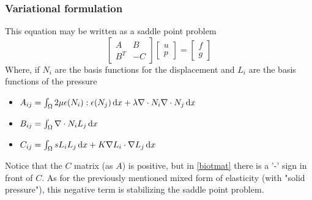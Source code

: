\begin{frame}
\frametitle{Variational formulation}
This equation may be written as a saddle point problem 
\begin{equation}
\label{biotmat}
\left[
\begin{array}{cc}
A & B \\
B^T & -C
\end{array}
\right]
\left[
\begin{array}{c} u \\ p \end{array} 
\right]
= 
\left[
\begin{array}{c} f \\ g \end{array} 
\right]
\end{equation}
Where, if $N_i$ are the basis functions for the displacement 
and $L_i$ are the basis functions of the pressure
\begin{itemize}
\item $A_{ij} =  \int_\Omega 2 \mu \epsilon(N_i) : \epsilon(N_j) \, \mathrm{d}x + \lambda  \nabla \cdot N_i \nabla \cdot N_j \, \mathrm{d}x$ 
\item $B_{ij} =  \int_\Omega  \nabla \cdot N_i L_j\, \mathrm{d}x$ 
\item $C_{ij} =  \int_\Omega s  L_i L_j \, \mathrm{d}x + K \nabla L_i \cdot \nabla L_j \, \mathrm{d}x $ 
\end{itemize}

Notice that the $C$ matrix (as $A$) is positive, but 
in \eqref{biotmat} there is a '-' sign in front of $C$. 
As for the previously mentioned mixed form of 
elasticity (with "solid pressure"), this negative term is stabilizing
the saddle point problem. 

\end{frame}
